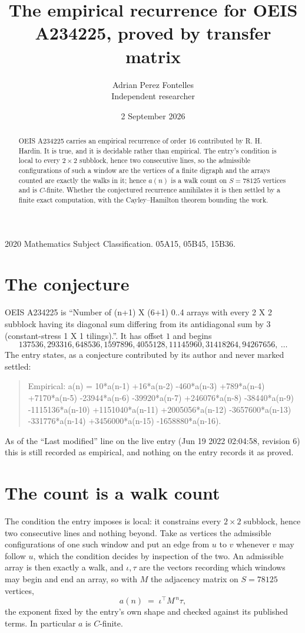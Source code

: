 \documentclass[11pt,a4paper]{article}
\title{The empirical recurrence for OEIS A234225, proved by transfer matrix}
\author{Adrian Perez Fontelles\\ \small Independent researcher}
\date{2 September 2026}
\theoremstyle{plain}
\theoremstyle{definition}
\begin{document}
\maketitle

\begin{abstract}
OEIS A234225 carries an empirical recurrence of order $16$ contributed by R. H. Hardin. It is
true, and it is decidable rather than empirical. The entry's condition is local to every $2\times2$ subblock, hence two consecutive lines, so
the admissible configurations of such a window are the vertices of a finite digraph and the
arrays counted are exactly the walks in it; hence $a(n)$ is a walk count on $S=78125$ vertices
and is $C$-finite. Whether the conjectured recurrence annihilates it is then settled by a
finite exact computation, with the Cayley--Hamilton theorem bounding the work.
\end{abstract}

\noindent\small 2020 Mathematics Subject Classification. 05A15, 05B45, 15B36.\normalsize

\section{The conjecture}

OEIS A234225 is ``Number of (n+1) X (6+1) 0..4 arrays with every 2 X 2 subblock having its diagonal sum differing from its antidiagonal sum by 3 (constant-stress 1 X 1 tilings).''. It has offset $1$ and begins
\[
137536, 293316, 648536, 1597896, 4055128, 11145960, 31418264, 94267656,\ \dots
\]
The entry states, as a conjecture contributed by its author and never marked settled:
\begin{quote}
Empirical: a(n) = 10*a(n-1) +16*a(n-2) -460*a(n-3) +789*a(n-4) +7170*a(n-5) -23944*a(n-6) -39920*a(n-7) +246076*a(n-8) -38440*a(n-9) -1115136*a(n-10) +1151040*a(n-11) +2005056*a(n-12) -3657600*a(n-13) -331776*a(n-14) +3456000*a(n-15) -1658880*a(n-16).
\end{quote}
As of the ``Last modified'' line on the live entry (Jun 19 2022 02:04:58, revision 6) this is still
recorded as empirical, and nothing on the entry records it as proved.

\section{The count is a walk count}

The condition the entry imposes is local: it constrains every $2\times2$ subblock, hence two consecutive lines and nothing beyond. Take as vertices the admissible configurations of one such window and put an edge from $u$ to $v$ whenever $v$ may follow $u$, which the condition decides by inspection of the two.
An admissible array is then exactly a walk, and $\iota,\tau$ are the vectors recording which windows may begin and end an array, so with $M$ the adjacency matrix on $S=78125$ vertices,
\[
a(n)\;=\;\iota^{\!\top}M^{\,n}\tau ,
\]
the exponent fixed by the entry's own shape and checked against its published terms. In
particular $a$ is $C$-finite.
\end{document}
